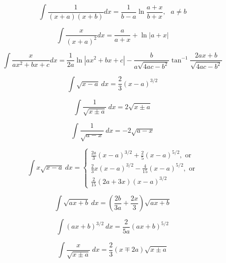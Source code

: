 \begin{equation*}
\int \frac{1}{(x+a)(x+b)}dx = \frac{1}{b-a}\ln\frac{a+x}{b+x}, \text{ } a\ne b
\end{equation*}

\begin{equation*}
\int \frac{x}{(x+a)^2}dx = \frac{a}{a+x}+\ln |a+x|
\end{equation*}


\begin{equation*}
\int \frac{x}{ax^2+bx+c}dx = \frac{1}{2a}\ln|ax^2+bx+c| 
-\frac{b}{a\sqrt{4ac-b^2}}\tan^{-1}\frac{2ax+b}{\sqrt{4ac-b^2}}
\end{equation*}

\begin{equation*}
\int \sqrt{x-a}\ dx = \frac{2}{3}(x-a)^{3/2}
\end{equation*}

\begin{equation*}
\int \frac{1}{\sqrt{x\pm a}}\ dx = 2\sqrt{x\pm a} 
\end{equation*}

\begin{equation*}\label{eq:Rigo}
\int \frac{1}{\sqrt{a-x}}\ dx = -2\sqrt{a-x} 
\end{equation*}


\begin{equation*}\label{eq:Gilmore}
\int x\sqrt{x-a}\ dx =  
\left\{
\begin{array}{l}
\frac{2 a}{3} \left({x-a}\right)^{3/2} +\frac{2 }{5}\left( {x-a}\right)^{5/2},\text{ or} 
\\ \frac{2}{3} x(x-a)^{3/2} - \frac{4}{15} (x-a)^{5/2}, \text{ or}
\\ \frac{2}{15}(2a+3x)(x-a)^{3/2}
\end{array}
\right.
\end{equation*}

\begin{equation*}
\int \sqrt{ax+b}\ dx = \left(\frac{2b}{3a}+\frac{2x}{3}\right)\sqrt{ax+b} 
\end{equation*}

\begin{equation*}
\int (ax+b)^{3/2}\ dx =\frac{2}{5a}(ax+b)^{5/2}
\end{equation*}

\begin{equation*}\label{eq:Weems}
\int \frac{x}{\sqrt{x\pm a} } \ dx = \frac{2}{3}(x\mp 2a)\sqrt{x\pm a}
\end{equation*}

